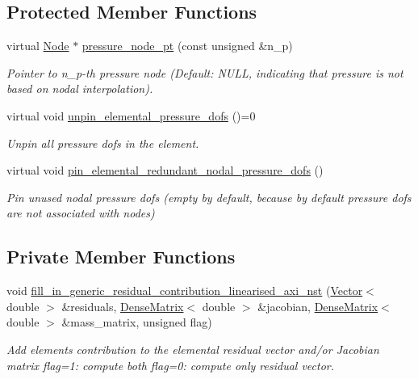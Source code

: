 \subsection*{Protected Member Functions}
\begin{DoxyCompactItemize}
\item 
virtual \hyperlink{classoomph_1_1Node}{Node} $\ast$ \hyperlink{classoomph_1_1RefineableLinearisedAxisymmetricNavierStokesEquations_a2d10829ef102b2877b4a5bb48b6ea770}{pressure\+\_\+node\+\_\+pt} (const unsigned \&n\+\_\+p)
\begin{DoxyCompactList}\small\item\em Pointer to n\+\_\+p-\/th pressure node (Default\+: N\+U\+LL, indicating that pressure is not based on nodal interpolation). \end{DoxyCompactList}\item 
virtual void \hyperlink{classoomph_1_1RefineableLinearisedAxisymmetricNavierStokesEquations_a7a0d635c46d7faabe63c432b3435455d}{unpin\+\_\+elemental\+\_\+pressure\+\_\+dofs} ()=0
\begin{DoxyCompactList}\small\item\em Unpin all pressure dofs in the element. \end{DoxyCompactList}\item 
virtual void \hyperlink{classoomph_1_1RefineableLinearisedAxisymmetricNavierStokesEquations_ae38c5e1d9851e7b3198443cde943620f}{pin\+\_\+elemental\+\_\+redundant\+\_\+nodal\+\_\+pressure\+\_\+dofs} ()
\begin{DoxyCompactList}\small\item\em Pin unused nodal pressure dofs (empty by default, because by default pressure dofs are not associated with nodes) \end{DoxyCompactList}\end{DoxyCompactItemize}
\subsection*{Private Member Functions}
\begin{DoxyCompactItemize}
\item 
void \hyperlink{classoomph_1_1RefineableLinearisedAxisymmetricNavierStokesEquations_a5f8f964976bf7460c41360ceab7b0f18}{fill\+\_\+in\+\_\+generic\+\_\+residual\+\_\+contribution\+\_\+linearised\+\_\+axi\+\_\+nst} (\hyperlink{classoomph_1_1Vector}{Vector}$<$ double $>$ \&residuals, \hyperlink{classoomph_1_1DenseMatrix}{Dense\+Matrix}$<$ double $>$ \&jacobian, \hyperlink{classoomph_1_1DenseMatrix}{Dense\+Matrix}$<$ double $>$ \&mass\+\_\+matrix, unsigned flag)
\begin{DoxyCompactList}\small\item\em Add element\textquotesingle{}s contribution to the elemental residual vector and/or Jacobian matrix flag=1\+: compute both flag=0\+: compute only residual vector. \end{DoxyCompactList}\end{DoxyCompactItemize}
